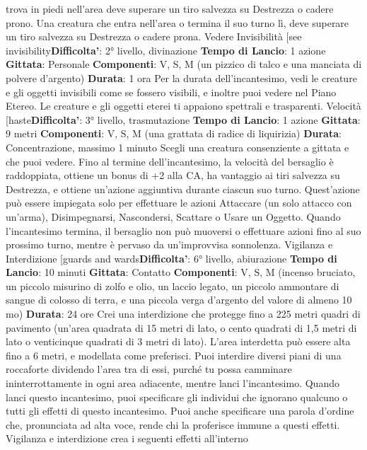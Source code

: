 \begin{multicols}{2}
trova in piedi nell’area deve superare un tiro salvezza
su Destrezza o cadere prono. Una creatura che entra
nell’area o termina il suo turno lì, deve superare un tiro
salvezza su Destrezza o cadere prona.
Vedere Invisibilità
[see invisibility\textbf{Difficolta'}:
2° livello, divinazione
\textbf{Tempo di Lancio}: 1 azione
\textbf{Gittata}: Personale
\textbf{Componenti}: V, S, M (un pizzico di talco e una
manciata di polvere d’argento)
\textbf{Durata}: 1 ora
Per la durata dell’incantesimo, vedi le creature e gli
oggetti invisibili come se fossero visibili, e inoltre puoi
vedere nel Piano Etereo. Le creature e gli oggetti eterei
ti appaiono spettrali e trasparenti.
Velocità
[haste\textbf{Difficolta'}:
3° livello, trasmutazione
\textbf{Tempo di Lancio}: 1 azione
\textbf{Gittata}: 9 metri
\textbf{Componenti}: V, S, M (una grattata di radice di
liquirizia)
\textbf{Durata}: Concentrazione, massimo 1 minuto
Scegli una creatura consenziente a gittata e che puoi
vedere. Fino al termine dell’incantesimo, la velocità del
bersaglio è raddoppiata, ottiene un bonus di +2 alla CA,
ha vantaggio ai tiri salvezza su Destrezza, e ottiene
un’azione aggiuntiva durante ciascun suo turno.
Quest’azione può essere impiegata solo per effettuare
le azioni Attaccare (un solo attacco con un’arma),
Disimpegnarsi, Nascondersi, Scattare o Usare un
Oggetto.
Quando l’incantesimo termina, il bersaglio non può
muoversi o effettuare azioni fino al suo prossimo turno,
mentre è pervaso da un’improvvisa sonnolenza.
Vigilanza e Interdizione
[guards and wards\textbf{Difficolta'}:
6° livello, abiurazione
\textbf{Tempo di Lancio}: 10 minuti
\textbf{Gittata}: Contatto
\textbf{Componenti}: V, S, M (incenso bruciato, un piccolo
misurino di zolfo e olio, un laccio legato, un piccolo
ammontare di sangue di colosso di terra, e una piccola
verga d’argento del valore di almeno 10 mo)
\textbf{Durata}: 24 ore
Crei una interdizione che protegge fino a 225 metri
quadri di pavimento (un’area quadrata di 15 metri di
lato, o cento quadrati di 1,5 metri di lato o venticinque
quadrati di 3 metri di lato). L’area interdetta può essere
alta fino a 6 metri, e modellata come preferisci. Puoi
interdire diversi piani di una roccaforte dividendo l’area
tra di essi, purché tu possa camminare
ininterrottamente in ogni area adiacente, mentre lanci
l’incantesimo.
Quando lanci questo incantesimo, puoi specificare gli
individui che ignorano qualcuno o tutti gli effetti di
questo incantesimo. Puoi anche specificare una parola
d’ordine che, pronunciata ad alta voce, rende chi la
proferisce immune a questi effetti.
Vigilanza e interdizione crea i seguenti effetti all’interno

\end{multicols}
